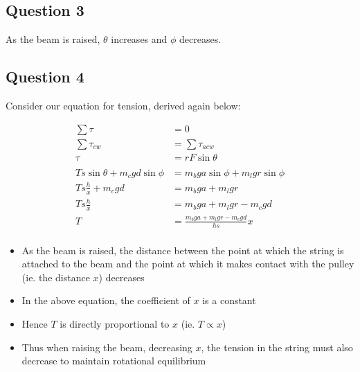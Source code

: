 \documentclass[a4paper,11pt]{article}
\begin{document}
\subsection{Question 3}

As the beam is raised, $\theta$ increases and $\phi$ decreases.


\subsection{Question 4}

Consider our equation for tension, derived again below:

$$
\begin{aligned}
\sum \tau & = 0 \\
\sum \tau_{cw} & = \sum \tau_{acw} \\
\tau & = r F \sin{\theta} \\
\\
T s \sin{\theta} + m_c g d \sin{\phi} & =  m_b g a \sin{\phi} + m_l g r \sin{\phi} \\
T s \frac{h}{x} + m_c g d & = m_b g a + m_l g r \\
T s \frac{h}{x} & = m_b g a + m_l g r - m_c g d \\
T & = \frac{m_b g a + m_l g r - m_c g d}{h s} x \\
\end{aligned}
$$

\begin{itemize}
\item As the beam is raised, the distance between the point at which the string is attached to the beam and the
	point at which it makes contact with the pulley (ie. the distance $x$) decreases
\item In the above equation, the coefficient of $x$ is a constant
\item Hence $T$ is directly proportional to $x$ (ie. $T \propto x$)
\item Thus when raising the beam, decreasing $x$, the tension in the string must also decrease to maintain rotational equilibrium
\end{itemize}

\end{document}
